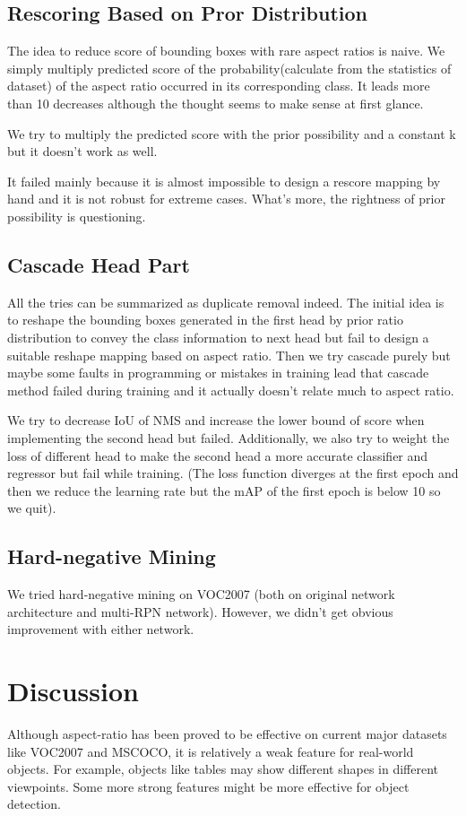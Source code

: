 \documentclass[10pt,twocolumn,letterpaper]{article}
\begin{document}
\subsection{Rescoring Based on Pror Distribution}
The idea to reduce score of bounding boxes with rare aspect ratios is naive. We simply multiply predicted score of the probability(calculate from the statistics of dataset) of the aspect ratio occurred in its corresponding class. It leads more than 10 decreases although the thought seems to make sense at first glance.
\par
We try to multiply the predicted score with the prior possibility and a constant k but it doesn't work as well.
\par
It failed mainly because it is almost impossible to design a rescore mapping by hand and it is not robust for extreme cases. What's more, the rightness of prior possibility is questioning.

\subsection{Cascade Head Part}
\par
All the tries can be summarized as duplicate removal indeed. The initial idea is to reshape the bounding boxes generated in the first head by prior ratio distribution to convey the class information to next head but fail to design a suitable reshape mapping based on aspect ratio. Then we try cascade purely but maybe some faults in programming or mistakes in training lead that cascade method failed during training and it actually doesn't relate much to aspect ratio.
\par
We try to decrease IoU of NMS and increase the lower bound of score when implementing the second head but failed. Additionally, we also try to weight the loss of different head to make the second head a more accurate classifier and regressor but fail while training. (The loss function diverges at the first epoch and then we reduce the learning rate but the mAP of the first epoch is below 10 so we quit).

\subsection{Hard-negative Mining}
We tried hard-negative mining on VOC2007 (both on original network architecture and multi-RPN network). However, we didn't get obvious improvement with either network. 


\section{Discussion}
\par
Although aspect-ratio has been proved to be effective on current major datasets like VOC2007\cite{voc07} and MSCOCO\cite{coco}, it is relatively a weak feature for real-world objects. For example, objects like tables may show different shapes in different viewpoints. Some more strong features might be more effective for object detection.  
\end{document}
